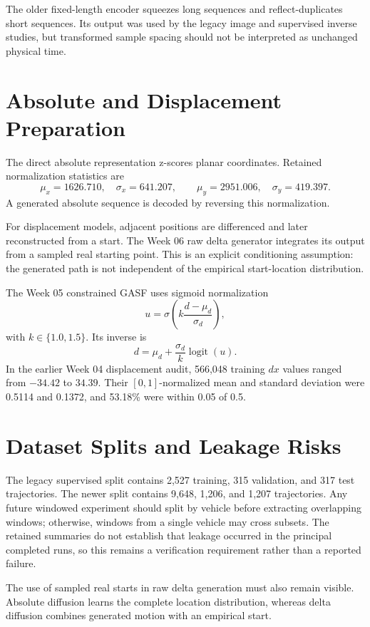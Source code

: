 \documentclass[12pt,a4paper,oneside]{report}
\begin{document}
The older fixed-length encoder squeezes long sequences and reflect-duplicates short sequences. Its output was used by the legacy image and supervised inverse studies, but transformed sample spacing should not be interpreted as unchanged physical time.

\section{Absolute and Displacement Preparation}

The direct absolute representation z-scores planar coordinates. Retained normalization statistics are
\[
\mu_x=1626.710,\quad \sigma_x=641.207,\qquad
\mu_y=2951.006,\quad \sigma_y=419.397.
\]
A generated absolute sequence is decoded by reversing this normalization.

For displacement models, adjacent positions are differenced and later reconstructed from a start. The Week 06 raw delta generator integrates its output from a sampled real starting point. This is an explicit conditioning assumption: the generated path is not independent of the empirical start-location distribution.

The Week 05 constrained GASF uses sigmoid normalization
\[
u=\sigma\!\left(k\frac{d-\mu_d}{\sigma_d}\right),
\]
with $k\in\{1.0,1.5\}$. Its inverse is
\[
d=\mu_d+\frac{\sigma_d}{k}\operatorname{logit}(u).
\]
In the earlier Week 04 displacement audit, 566,048 training $dx$ values ranged from $-34.42$ to $34.39$. Their $[0,1]$-normalized mean and standard deviation were 0.5114 and 0.1372, and 53.18\% were within 0.05 of 0.5.

\section{Dataset Splits and Leakage Risks}

The legacy supervised split contains 2,527 training, 315 validation, and 317 test trajectories. The newer split contains 9,648, 1,206, and 1,207 trajectories. Any future windowed experiment should split by vehicle before extracting overlapping windows; otherwise, windows from a single vehicle may cross subsets. The retained summaries do not establish that leakage occurred in the principal completed runs, so this remains a verification requirement rather than a reported failure.

The use of sampled real starts in raw delta generation must also remain visible. Absolute diffusion learns the complete location distribution, whereas delta diffusion combines generated motion with an empirical start.
\end{document}
